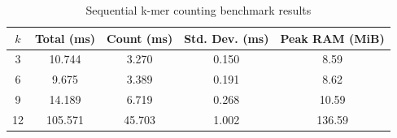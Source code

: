 \begin{table}[ht]
    \centering
    \caption{Sequential k-mer counting benchmark results}
    \begin{tabular}{ccccc}
        \toprule
        $k$ & Total (ms) & Count (ms) & Std. Dev. (ms) & Peak RAM (MiB) \\
        \midrule
        3 & 10.744 & 3.270 & 0.150 & 8.59 \\
        6 & 9.675 & 3.389 & 0.191 & 8.62 \\
        9 & 14.189 & 6.719 & 0.268 & 10.59 \\
        12 & 105.571 & 45.703 & 1.002 & 136.59 \\
        \bottomrule
    \end{tabular}
    \label{tab:sequential_results}
\end{table}
